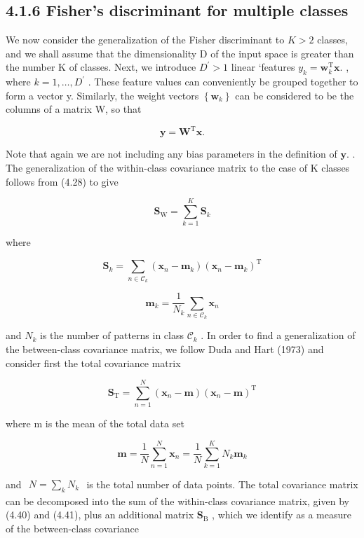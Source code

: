 \documentclass[
  10
]{article}
\begin{document}
\subsection{4.1.6 Fisher's discriminant for multiple
classes}\label{fishers-discriminant-for-multiple-classes}

We now consider the generalization of the Fisher discriminant to
\(K > 2\) classes, and we shall assume that the dimensionality D of the
input space is greater than the number K of classes. Next, we introduce
\(D ^ { \prime } > 1\) linear `features
\(y _ { k } = \mathbf { w } _ { k } ^ { \mathrm { T } } \mathbf { x } .\)
, where \(k = 1 , \ldots , D ^ { \prime }\) . These feature values can
conveniently be grouped together to form a vector y. Similarly, the
weight vectors \(\left\{ \mathbf { w } _ { k } \right\}\) can be
considered to be the columns of a matrix W, so that

\[
\mathbf {y} = \mathbf {W} ^ {\mathrm{T}} \mathbf {x}.\tag{4.39}
\]

Note that again we are not including any bias parameters in the
definition of \(\mathbf { y } .\) . The generalization of the
within-class covariance matrix to the case of K classes follows from
(4.28) to give

\[
\mathbf {S} _ {\mathrm{W}} = \sum_ {k = 1} ^ {K} \mathbf {S} _ {k}\tag{4.40}
\]

where

\[
\mathbf {S} _ {k} = \sum_ {n \in \mathcal {C} _ {k}} (\mathbf {x} _ {n} - \mathbf {m} _ {k}) (\mathbf {x} _ {n} - \mathbf {m} _ {k}) ^ {\mathrm{T}}\tag{4.41}
\]

\[
{\mathbf m} _ {k} = \frac {1}{N _ {k}} \sum_ {n \in \mathcal {C} _ {k}} {\mathbf x} _ {n}\tag{4.42}
\]

and \(N _ { k }\) is the number of patterns in class
\(\mathcal { C } _ { k }\) . In order to find a generalization of the
between-class covariance matrix, we follow Duda and Hart (1973) and
consider first the total covariance matrix

\[
\mathbf {S} _ {\mathrm{T}} = \sum_ {n = 1} ^ {N} (\mathbf {x} _ {n} - \mathbf {m}) (\mathbf {x} _ {n} - \mathbf {m}) ^ {\mathrm{T}}\tag{4.43}
\]

where m is the mean of the total data set

\[
\mathbf {m} = \frac {1}{N} \sum_ {n = 1} ^ {N} \mathbf {x} _ {n} = \frac {1}{N} \sum_ {k = 1} ^ {K} N _ {k} \mathbf {m} _ {k}\tag{4.44}
\]

and \(\begin{array} { r } { N = \sum _ { k } N _ { k } } \end{array}\)
is the total number of data points. The total covariance matrix can be
decomposed into the sum of the within-class covariance matrix, given by
(4.40) and (4.41), plus an additional matrix
\(\mathbf { S } _ { \mathrm { B } }\) , which we identify as a measure
of the between-class covariance
\end{document}
